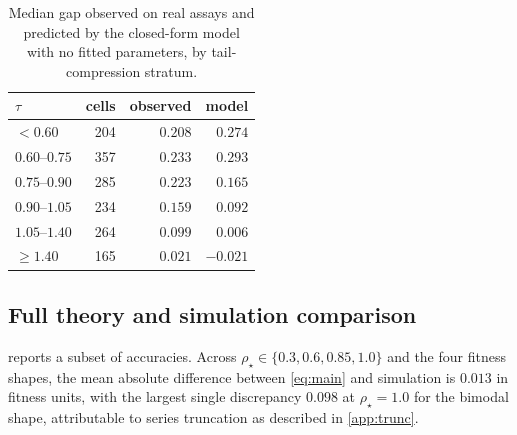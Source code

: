 \documentclass{article}
\theoremstyle{plain}
\theoremstyle{definition}
\begin{document}
\begin{table}[ht]
\caption{Median gap observed on real assays and predicted by the closed-form model with
no fitted parameters, by tail-compression stratum.}
\label{tab:closedform}
\vskip 0.1in
\begin{center}
\begin{small}
\begin{tabular}{lrrr}
\toprule
$\tau$ & cells & observed & model \\
\midrule
$<0.60$        & 204 & $0.208$ & $0.274$ \\
$0.60$--$0.75$ & 357 & $0.233$ & $0.293$ \\
$0.75$--$0.90$ & 285 & $0.223$ & $0.165$ \\
$0.90$--$1.05$ & 234 & $0.159$ & $0.092$ \\
$1.05$--$1.40$ & 264 & $0.099$ & $0.006$ \\
$\ge 1.40$     & 165 & $0.021$ & $-0.021$ \\
\bottomrule
\end{tabular}
\end{small}
\end{center}
\vskip -0.1in
\end{table}

\subsection{Full theory and simulation comparison}
\label{app:fulltheory}

 reports a subset of accuracies. Across $\rho_\star \in \{0.3, 0.6,
0.85, 1.0\}$ and the four fitness shapes, the mean absolute difference between
\cref{eq:main} and simulation is $0.013$ in fitness units, with the largest single
discrepancy $0.098$ at $\rho_\star = 1.0$ for the bimodal shape, attributable to series
truncation as described in \cref{app:trunc}.
\end{document}

